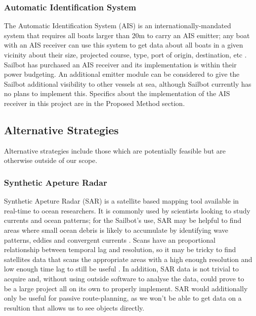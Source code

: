 \subsubsection{\label{sec:intro:technical-background:ais}Automatic Identification System}
The Automatic Identification System (AIS) is an internationally-mandated system that requires all boats larger than 20m to carry an AIS emitter; any boat with an AIS receiver can use this system to get data about all boats in a given vicinity about their size, projected course, type, port of origin, destination, etc  \cite{us-ais-requirements}. Sailbot has purchased an AIS receiver and its implementation is within their power budgeting. An additional emitter module can be considered to give the Sailbot additional visibility to other vessels at sea, although Sailbot currently has no plans to implement this. Specifics about the implementation of the AIS receiver in this project are in the Proposed Method section.


\subsection{\label{sec:intro:alternatives}Alternative Strategies}
Alternative strategies include those which are potentially feasible but are otherwise outside of our scope. 


\subsubsection{\label{sec:intro:alternatives:sar}Synthetic Apeture Radar}
Synthetic Apeture Radar (SAR) is a satellite based mapping tool available in real-time to ocean researchers. It is commonly used by scientists looking to study currents and ocean patterns; for the Sailbot's use, SAR may be helpful to find areas where small ocean debris is likely to accumulate by identifying wave patterns, eddies and convergent currents  \cite{SAR-manual}. Scans have an proportional relationship between temporal lag and resolution, so it may be tricky to find satellites data that scans the appropriate areas with a high enough resolution and low enough time lag to still be useful \cite{Mace}. In addition, SAR data is not trivial to acquire and, without using outside software to analyse the data, could prove to be a large project all on its own to properly implement. SAR would additionally only be useful for passive route-planning, as we won't be able to get data on a resultion that allows us to see objects directly.

